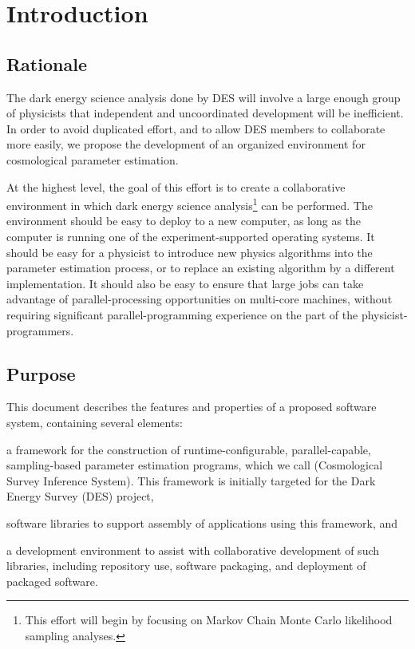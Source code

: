 \documentclass[draftmode,draftwater]{memarticle}
\newcommand{\cosmosis}{\name{CosmoSIS}\xspace}
\begin{document}
	
\topmatter	%

\chapter{Introduction\label{ch:introduction}}


\section{Rationale\label{sec:rationale}}

The dark energy science analysis done by DES will involve a large enough
group of physicists
that independent and uncoordinated development will be inefficient. In order to
avoid duplicated effort, and to allow DES members to 
collaborate more easily, we propose the
development of an organized environment for cosmological parameter
estimation.

At the highest level, the goal of this effort is to create a
collaborative environment in which dark energy science
analysis\footnote{This effort will begin by focusing on Markov Chain
  Monte Carlo likelihood sampling analyses.} can
be performed. The environment should be easy to deploy to a new computer,
as long as the computer is running one of the experiment-supported
operating systems. It should be easy for a physicist to introduce new
physics algorithms into the parameter estimation process, or to
replace an existing algorithm by a different implementation. It should
also be easy to ensure that large jobs can take advantage of
parallel-processing opportunities on multi-core machines, without
requiring significant parallel-programming experience on the part of
the physicist-programmers.

\section{Purpose\label{sec:purpose}}

This document describes the features and properties of a proposed
software system, containing several elements:
\begin{inparaenum}[(a)]
\item a framework for the construction of runtime-configurable,
parallel-capable, sampling-based parameter estimation programs, which we
call \cosmosis (Cosmological Survey Inference System). This framework is initially targeted for the Dark Energy
Survey (DES)\cite{des} project,
\item software libraries to support assembly of applications using this
  framework, and
\item a development environment to assist with collaborative development
 of such libraries, including repository use, software packaging, and
 deployment of packaged software.
\end{inparaenum}
\end{document}
